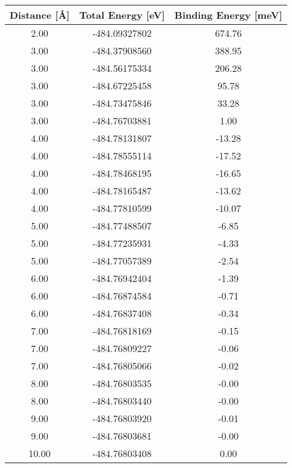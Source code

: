 \begin{tabular}{ccc}
\hline
Distance [\AA] & Total Energy [eV] & Binding Energy [meV] \\
\hline
2.00 & -484.09327802 & 674.76 \\
3.00 & -484.37908560 & 388.95 \\
3.00 & -484.56175334 & 206.28 \\
3.00 & -484.67225458 & 95.78 \\
3.00 & -484.73475846 & 33.28 \\
3.00 & -484.76703881 & 1.00 \\
4.00 & -484.78131807 & -13.28 \\
4.00 & -484.78555114 & -17.52 \\
4.00 & -484.78468195 & -16.65 \\
4.00 & -484.78165487 & -13.62 \\
4.00 & -484.77810599 & -10.07 \\
5.00 & -484.77488507 & -6.85 \\
5.00 & -484.77235931 & -4.33 \\
5.00 & -484.77057389 & -2.54 \\
6.00 & -484.76942404 & -1.39 \\
6.00 & -484.76874584 & -0.71 \\
6.00 & -484.76837408 & -0.34 \\
7.00 & -484.76818169 & -0.15 \\
7.00 & -484.76809227 & -0.06 \\
7.00 & -484.76805066 & -0.02 \\
8.00 & -484.76803535 & -0.00 \\
8.00 & -484.76803440 & -0.00 \\
9.00 & -484.76803920 & -0.01 \\
9.00 & -484.76803681 & -0.00 \\
10.00 & -484.76803408 & 0.00 \\
\hline
\end{tabular}